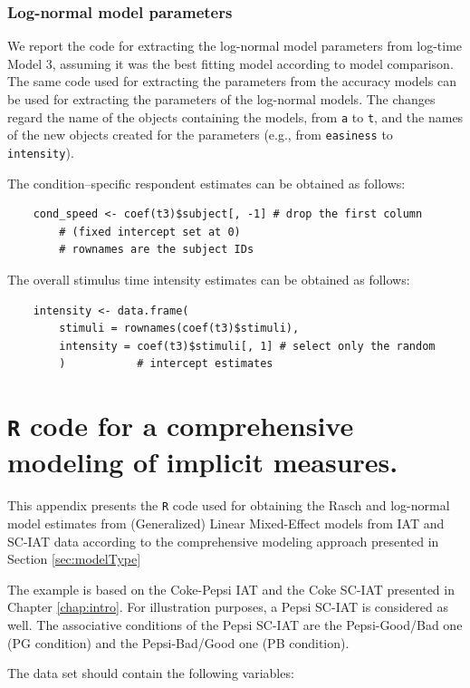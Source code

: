 \documentclass[12pt]{book}
\begin{document}
\subsection{Log-normal model parameters}

We report the code for extracting the log-normal model parameters from log-time Model 3, assuming it was the best fitting model according to model comparison. The same code used for extracting the parameters from the accuracy models can be used for extracting the parameters of the log-normal models. The changes regard the name of the objects containing the models, from \texttt{a} to \texttt{t}, and the names of the new objects created for the parameters (e.g., from \texttt{easiness} to \texttt{intensity}).

The condition--specific respondent estimates can be obtained as follows: 
%
\begin{lstlisting}
	cond_speed <- coef(t3)$subject[, -1] # drop the first column 
		# (fixed intercept set at 0)
		# rownames are the subject IDs
\end{lstlisting}
The overall stimulus time intensity estimates can be obtained as follows: 
%
\begin{lstlisting}
	intensity <- data.frame(
		stimuli = rownames(coef(t3)$stimuli),
		intensity = coef(t3)$stimuli[, 1] # select only the random
		)			# intercept estimates	
\end{lstlisting}	

\chapter[Appendix B]{\texttt{R} code for a comprehensive modeling of implicit measures.} \label{chap:appendixB}

This appendix presents the \verb*|R| code used for obtaining the Rasch and log-normal model estimates from (Generalized) Linear Mixed-Effect models from IAT and SC-IAT data according to the comprehensive modeling approach presented in Section \ref{sec:modelType}

The example is based on the Coke-Pepsi IAT and the Coke SC-IAT presented in Chapter \ref{chap:intro}. 
For illustration purposes, a Pepsi SC-IAT is considered as well. 
The associative conditions of the Pepsi SC-IAT are the Pepsi-Good/Bad one (PG condition) and the Pepsi-Bad/Good one (PB condition). 

The data set should contain the following variables:
\end{document}
